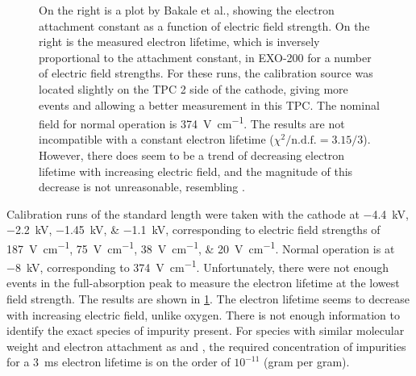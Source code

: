 \documentclass[herrin-thesis.tex]{subfiles}
\begin{document}
\begin{figure}[htb]
\begin{subfigure}[b]{0.55\linewidth}
\end{subfigure}
\caption[Electron lifetime vs. electric field]{On the right is a plot by Bakale et al.\cite{Bakale:1976ly}, showing the electron attachment constant as a function of electric field strength. On the right is the measured electron lifetime, which is inversely proportional to the attachment constant, in EXO-200 for a number of electric field strengths. For these runs, the calibration source was located slightly on the TPC 2 side of the cathode, giving more events and allowing a better measurement in this TPC. The nominal field for normal operation is \SI{374}{\V\per\cm}. The results are not incompatible with a constant electron lifetime (\(\chi^2/\text{n.d.f.} = 3.15/3\)). However, there does seem to be a trend of decreasing electron lifetime with increasing electric field, and the magnitude of this decrease is not unreasonable, resembling .}
\label{fig:el_attachment_vs_efield}
\label{fig:el_lifetime_vs_efield}
\end{figure}

Calibration runs of the standard length were taken with the cathode at \SIlist{-4.4;-2.2;-1.45; -1.1}{\kilo\V}, corresponding to electric field strengths of \SIlist{187;75;38;20}{\V\per\cm}. Normal operation is at \SI{-8}{\kilo\V}, corresponding to \SI{374}{\V\per\cm}. Unfortunately, there were not enough events in the full-absorption peak to measure the electron lifetime at the lowest field strength. The results are shown in \cref{fig:el_lifetime_vs_efield}. The electron lifetime seems to decrease with increasing electric field, unlike oxygen. There is not enough information to identify the exact species of impurity present. For species with similar molecular weight and electron attachment as  and , the required concentration of impurities for a \SI{3}{\ms} electron lifetime is on the order of \(10^{-11}\) (gram per gram).

%
%
\end{document}
